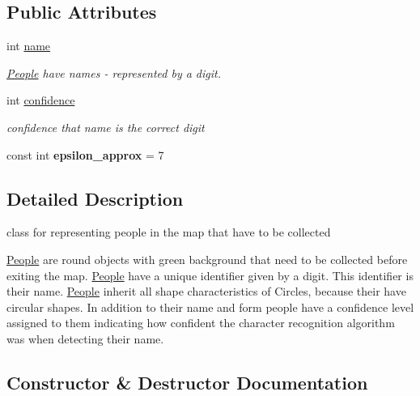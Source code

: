 \subsection*{Public Attributes}
\begin{DoxyCompactItemize}
\item 
\mbox{\label{class_l_a_r_1_1_people_addf5a566f9f3f56158b1650f688a91bb}} 
int \mbox{\hyperlink{class_l_a_r_1_1_people_addf5a566f9f3f56158b1650f688a91bb}{name}}
\begin{DoxyCompactList}\small\item\em \mbox{\hyperlink{class_l_a_r_1_1_people}{People}} have names -\/ represented by a digit. \end{DoxyCompactList}\item 
\mbox{\label{class_l_a_r_1_1_people_a0d85abfa8350cce48a5d4414a1dfcdd5}} 
int \mbox{\hyperlink{class_l_a_r_1_1_people_a0d85abfa8350cce48a5d4414a1dfcdd5}{confidence}}
\begin{DoxyCompactList}\small\item\em confidence that name is the correct digit \end{DoxyCompactList}\item 
\mbox{\label{class_l_a_r_1_1_people_a601ada9c3e408cc930a778961166364c}} 
const int {\bfseries epsilon\+\_\+approx} = 7
\end{DoxyCompactItemize}


\subsection{Detailed Description}
class for representing people in the map that have to be collected 

\mbox{\hyperlink{class_l_a_r_1_1_people}{People}} are round objects with green background that need to be collected before exiting the map. \mbox{\hyperlink{class_l_a_r_1_1_people}{People}} have a unique identifier given by a digit. This identifier is their name. \mbox{\hyperlink{class_l_a_r_1_1_people}{People}} inherit all shape characteristics of Circles, because their have circular shapes. In addition to their name and form people have a confidence level assigned to them indicating how confident the character recognition algorithm was when detecting their name. 

\subsection{Constructor \& Destructor Documentation}
\mbox{\label{class_l_a_r_1_1_people_a87e2350faa20d4ac7298123f19b73953}} 
